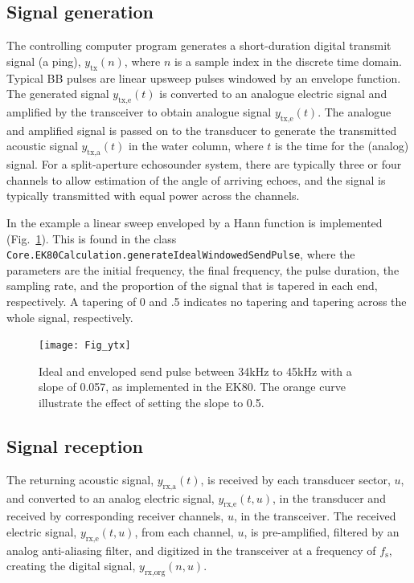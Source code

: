 \documentclass[preprint,12pt,TurnOnLineNumbers]{JASAnew}
\newcommand{\timesym}{t}
\newcommand{\samplesymt}{n}
\newcommand{\channelsym}{u}
\newcommand{\fs}{f_{\textrm{s}}}
\newcommand{\ytxe}{y_{\textrm{tx,e}}}
\newcommand{\ytxa}{y_{\textrm{tx,a}}}
\newcommand{\yrxa}{y_{\textrm{rx,a}}}
\newcommand{\yrxe}{y_{\textrm{rx,e}}}
\newcommand{\ytx}{y_{\textrm{tx}}}
\newcommand{\yrxorg}{y_{\textrm{rx,org}}}
\begin{document}
\subsection{Signal generation}

The controlling computer program generates a short-duration digital transmit signal (a ping), $\ytx(\samplesymt)$, where $\samplesymt$ is a sample index in the discrete time domain. Typical BB pulses are linear upsweep pulses windowed by an envelope function. The generated signal $\ytxe(\timesym)$ is converted to an analogue electric signal and amplified by the transceiver to obtain analogue signal $\ytxe(\timesym)$. The analogue and amplified signal is passed on to the transducer to generate the transmitted acoustic signal $\ytxa(\timesym)$ in the water column, where $\timesym$ is the time for the (analog) signal. For a split-aperture echosounder system, there are typically three or four channels to allow estimation of the angle of arriving echoes, and the signal is typically transmitted with equal power across the channels.

In the example a linear sweep enveloped by a Hann function is implemented (Fig.~\ref{fi:ytx}). This is found in the class \verb|Core.EK80Calculation.generateIdealWindowedSendPulse|, where the parameters are the initial frequency, the final frequency, the pulse duration, the sampling rate, and the proportion of the signal that is tapered in each end, respectively. A tapering of 0 and .5 indicates no tapering and tapering across the whole signal, respectively.
\begin{figure}
\texttt{[image: Fig\_ytx]}
\caption{\label{fi:ytx} Ideal and enveloped send pulse between 34kHz to 45kHz with a slope of 0.057, as implemented in the EK80. The orange curve illustrate the effect of setting the slope to 0.5.}
\end{figure}

\subsection{Signal reception}

The returning acoustic signal, $\yrxa(\timesym)$, is received by each transducer sector, $\channelsym$, and converted to an analog electric signal, $\yrxe(\timesym,\channelsym)$, in the transducer and received by corresponding receiver channels, $\channelsym$, in the transceiver. The received electric signal, $\yrxe(\timesym,\channelsym)$, from each channel, $\channelsym$, is pre-amplified, filtered by an analog anti-aliasing filter, and digitized in the transceiver at a frequency of $\fs$, creating the digital signal, $\yrxorg(\samplesymt,\channelsym)$.
\end{document}
